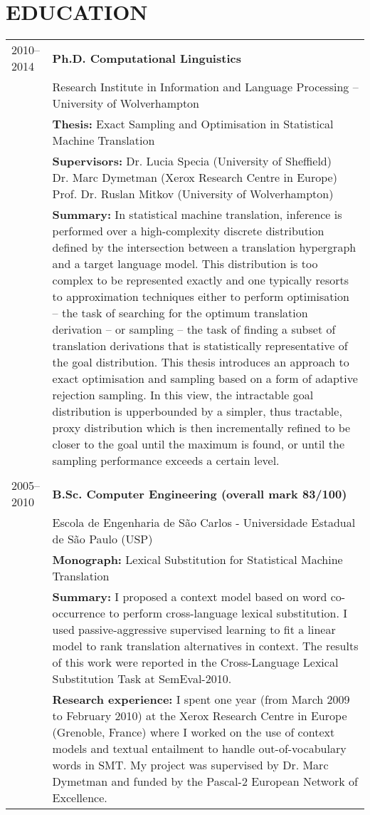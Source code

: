 \section*{EDUCATION}

\begin{tabular}{p{2cm}  p{13.92cm}}
2010--2014 & \bf Ph.D. Computational Linguistics  \\
 & Research Institute in Information and Language Processing – University of Wolverhampton \\
 & {\bf Thesis:} Exact Sampling and Optimisation in Statistical Machine Translation \\
 & {\bf Supervisors:} \pbox[t]{13.92cm}{Dr. Lucia Specia (University of Sheffield) \\ Dr. Marc Dymetman (Xerox Research Centre in Europe) \\ Prof. Dr. Ruslan Mitkov (University of Wolverhampton)} \\
 & {\bf Summary:} In statistical machine translation, inference is performed over a high-complexity discrete distribution defined by the intersection between a translation hypergraph and a target language model. This distribution is too complex to be represented exactly and one typically resorts to approximation techniques either to perform optimisation -- the task of searching for the optimum translation derivation -- or sampling -- the task of finding a subset of translation derivations that is statistically representative of the goal distribution.  This thesis introduces an approach to exact optimisation and sampling based on a form of adaptive rejection sampling. In this view, the intractable goal distribution is upperbounded by a simpler, thus tractable, proxy distribution which is then incrementally refined to be closer to the goal until the maximum is found, or until the sampling performance exceeds a certain level.\\
 & \\
2005--2010 	& \bf B.Sc. Computer Engineering (overall mark 83/100) \\
 & Escola de Engenharia de S\~ao Carlos - Universidade Estadual de S\~ao Paulo (USP) \\
 & {\bf Monograph:} Lexical Substitution for Statistical Machine Translation \\
 & {\bf Summary:} I proposed a context model based on word co-occurrence to perform cross-language lexical substitution. I used passive-aggressive supervised learning to fit a linear model to rank translation alternatives in context. The results of this work were reported in the Cross-Language Lexical Substitution Task at SemEval-2010. \\
 & {\bf Research experience:} I spent one year (from March 2009 to February 2010) at the Xerox Research Centre in Europe (Grenoble, France) where I worked on the use of context models and textual entailment to handle out-of-vocabulary words in SMT. My project was supervised by Dr. Marc Dymetman and funded by the Pascal-2 European Network of Excellence.\\
\end{tabular}

